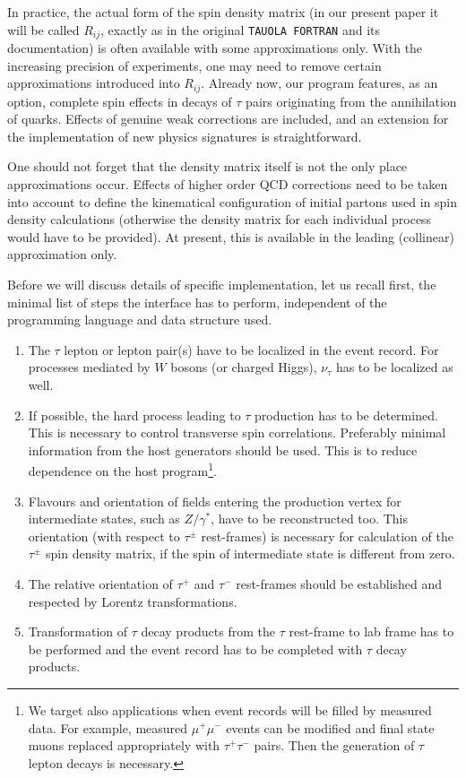 \documentclass[]{Tauola_interface_design}
\begin{document}
In practice, the actual form of the spin density matrix 
(in our present paper it will be called $R_{ij}$, exactly as in the original 
{\tt TAUOLA FORTRAN} and its documentation) is often available  with some
approximations only.
With the increasing precision  of experiments,  
one may need to remove certain approximations introduced into $R_{ij}$.
Already now, our program  features, as an option,
complete spin effects in decays of $\tau$ pairs originating from the annihilation 
of quarks. Effects of genuine weak corrections are included, and an extension 
for the implementation of new physics signatures is straightforward. 
 
One should not forget that the density matrix itself is not the only place
approximations occur.  Effects of higher 
order QCD 
corrections need to be taken into account to define the kinematical configuration 
of initial partons 
used in spin density calculations (otherwise the density matrix for each individual 
process would have to be provided). At present, this is available in the 
 leading (collinear) approximation only.

Before we will discuss details of  specific implementation, let us recall 
first, the minimal list of steps the interface has to perform, independent 
of the programming language and data structure used.

\begin{enumerate}
\item The $\tau$ lepton or lepton pair(s) have to be localized in the 
event record. For processes mediated by $W$ bosons (or charged Higgs), 
 $\nu_\tau$ has to be localized as well.
\item
 If possible, the hard process leading to $\tau$ production has to be 
determined. This is necessary to control  transverse spin correlations.
Preferably minimal information from the host 
generators should be used. This is to reduce dependence on the host program\footnote{We 
target also applications when  event records will be filled by 
measured data. For example, 
measured $\mu^+ \mu^-$ events can be modified and final state muons replaced 
appropriately with $\tau^+ \tau^-$ pairs. Then the generation of $\tau$ lepton decays is necessary.}.
\item Flavours and orientation of fields entering the production vertex for intermediate states, such as 
$Z/\gamma^*$, 
 have to be reconstructed too. This orientation (with respect to $\tau^\pm$ 
rest-frames) is necessary for calculation of the $\tau^\pm$ spin density matrix,
if the spin of intermediate state is different from zero. 
\item The relative orientation of  $\tau^+$ and $\tau^-$ rest-frames 
should be established and respected by Lorentz transformations. 
\item Transformation of $\tau$ decay products from the $\tau$ rest-frame to 
lab frame has to be performed and the event record has to be completed  with $\tau$ decay products.
\end{enumerate}
\end{document}
